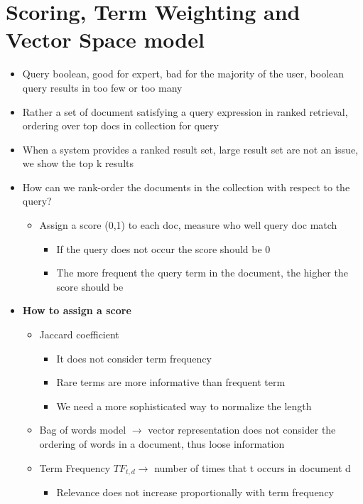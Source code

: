 \chapter{Scoring, Term Weighting and Vector Space model}
\begin{itemize}
    \item Query boolean, good for expert, bad for the majority of the user, boolean query results in too few or too many
    \item Rather a set of document satisfying a query expression in ranked retrieval, ordering over top docs in collection for query
    \item When a system provides a ranked result set, large result set are not an issue, we show the top k results
    \item How can we rank-order the documents in the collection with respect to the query?
    \begin{itemize}
        \item Assign a score (0,1) to each doc, measure who well query doc match
        \begin{itemize}
            \item If the query does not occur the score should be 0
            \item The more frequent the query term in the document, the higher the score should be
        \end{itemize}
    \end{itemize}
    \item \textbf{How to assign a score}
    \begin{itemize}
        \item Jaccard coefficient
        \begin{itemize}
            \item It does not consider term frequency
            \item Rare terms are more informative than frequent term
            \item We need a more sophisticated way to normalize the length
        \end{itemize}
        \item Bag of words model \(\rightarrow\) vector representation does not consider the ordering of words in a document, thus loose information
        \item Term Frequency \(TF_{t,d} \rightarrow\) number of times that t occurs in document d
        \begin{itemize}
            \item Relevance does not increase proportionally with term frequency

\end{itemize}
\end{itemize}
\end{itemize}
